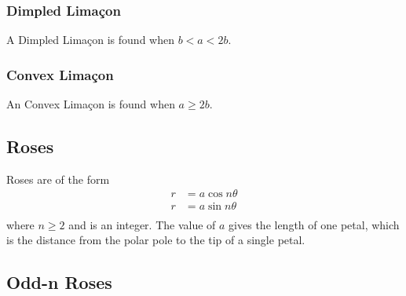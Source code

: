 \documentclass[11pt]{article}
\begin{document}
\subsubsection*{Dimpled Limaçon}

A Dimpled Limaçon is found when $b < a < 2b$.

\begin{center}
\end{center}

\subsubsection*{Convex Limaçon}

An Convex Limaçon is found when $a \geq 2b$.

\begin{center}
\end{center}

\subsection{Roses}

Roses are of the form
\begin{align*}
    r &= a\cos n\theta \\
    r &= a\sin n\theta \\
\end{align*}
where $n \geq 2$ and is an integer. The value of $a$ gives the length of one petal, which is the distance from the polar pole to the tip of a single petal.

\subsection*{Odd-n Roses}
\end{document}
